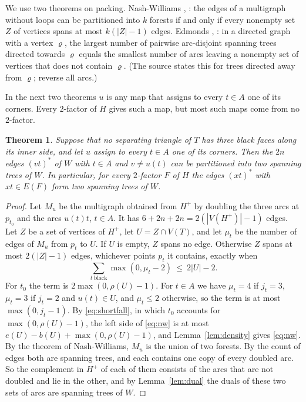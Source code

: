 \documentclass[10pt]{amsart}
\numberwithin{equation}{section}
\newtheorem{theorem}[equation]{Theorem}
\theoremstyle{definition}
\theoremstyle{remark}
\newcommand{\Hp}{H^{+}}
\begin{document}
We use two theorems on packing.
Nash-Williams \cite{NashWilliams}, \cite[Exercise~10.29]{SchrijverCourse}: the edges of a multigraph without loops can be partitioned into $k$ forests if and only if every nonempty set $Z$ of vertices spans at most $k(|Z|-1)$ edges.
Edmonds \cite{Edmonds}, \cite[pp.~1674 and 1685--1686]{SchrijverHandbook}: in a directed graph with a vertex $\varrho$, the largest number of pairwise arc-disjoint spanning trees directed towards $\varrho$ equals the smallest number of arcs leaving a nonempty set of vertices that does not contain $\varrho$.
(The source states this for trees directed away from $\varrho$; reverse all arcs.)

In the next two theorems $u$ is any map that assigns to every $t\in A$ one of its corners.
Every $2$-factor of $H$ gives such a map, but most such maps come from no $2$-factor.

\begin{theorem}\label{thm:twotrees}
Suppose that no separating triangle of $T$ has three black faces along its inner side, and let $u$ assign to every $t\in A$ one of its corners.
Then the $2n$ edges $(vt)^*$ of $W$ with $t\in A$ and $v\ne u(t)$ can be partitioned into two spanning trees of $W$.
In particular, for every $2$-factor $F$ of $H$ the edges $(xt)^*$ with $xt\in E(F)$ form two spanning trees of $W$.
\end{theorem}

\begin{proof}
Let $M_u$ be the multigraph obtained from $\Hp$ by doubling the three arcs at $p_{t_0}$ and the arcs $u(t)t$, $t\in A$.
It has $6+2n+2n=2(|V(\Hp)|-1)$ edges.
Let $Z$ be a set of vertices of $\Hp$, let $U=Z\cap V(T)$, and let $\mu_t$ be the number of edges of $M_u$ from $p_t$ to $U$.
If $U$ is empty, $Z$ spans no edge.
Otherwise $Z$ spans at most $2(|Z|-1)$ edges, whichever points $p_t$ it contains, exactly when
\begin{equation}\label{eq:nw}
\sum_{t\ \mathrm{black}}\max(0,\mu_t-2)\ \le\ 2|U|-2 .
\end{equation}
For $t_0$ the term is $2\max(0,\rho(U)-1)$.
For $t\in A$ we have $\mu_t=4$ if $j_t=3$, $\mu_t=3$ if $j_t=2$ and $u(t)\in U$, and $\mu_t\le2$ otherwise, so the term is at most $\max(0,j_t-1)$.
By \eqref{eq:shortfall}, in which $t_0$ accounts for $\max(0,\rho(U)-1)$, the left side of \eqref{eq:nw} is at most $e(U)-b(U)+\max(0,\rho(U)-1)$, and Lemma~\ref{lem:density} gives \eqref{eq:nw}.
By the theorem of Nash-Williams, $M_u$ is the union of two forests.
By the count of edges both are spanning trees, and each contains one copy of every doubled arc.
So the complement in $\Hp$ of each of them consists of the arcs that are not doubled and lie in the other, and by Lemma~\ref{lem:dual} the duals of these two sets of arcs are spanning trees of $W$.
\end{proof}
\end{document}

